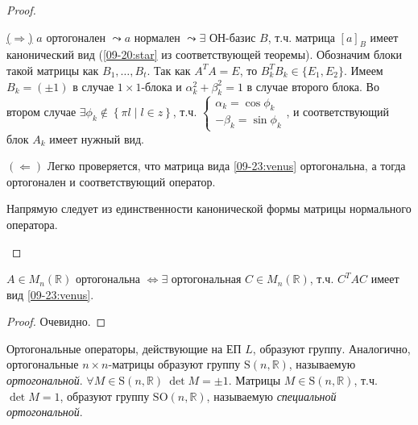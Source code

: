\begin{proof}
    \begin{proofpart}
        \underline{($\Rightarrow$)} $a$ ортогонален $\leadsto a$ нормален $\leadsto \exists$ ОН-базис $B$, т.ч. матрица $[a]_B$ имеет канонический вид (\eqref{09-20:star} из соответствующей теоремы). Обозначим блоки такой матрицы как $B_1, \dots, B_t$. Так как $A^T A = E$, то $B_k^T B_k \in \{E_1, E_2\}$. Имеем $B_k = (\pm 1)$ в случае $1 \times 1$-блока и $\alpha_k^2 + \beta_k^2 = 1$ в случае второго блока. Во втором случае $\exists \phi_k \not\in \left\{\pi l \mid l \in z \right\}$, т.ч. $\begin{cases}
            \alpha_k = \cos \phi_k \\
            -\beta_k = \sin \phi_k
        \end{cases}$, и соответствующий блок $A_k$ имеет нужный вид.
        \smallskip
        
        \underline{$(\Leftarrow)$} Легко проверяется, что матрица вида \eqref{09-23:venus} ортогональна, а тогда ортогонален и соответствующий оператор.
    \end{proofpart}

    \begin{proofpart}
        Напрямую следует из единственности канонической формы матрицы нормального оператора.
    \end{proofpart}
\end{proof}

\begin{cor*}
    $A \in M_n(\mathbb{R})$ ортогональна $\Leftrightarrow \exists$ ортогональная $C \in M_n(\mathbb{R})$, т.ч. $C^T AC$ имеет вид \eqref{09-23:venus}.
\end{cor*}

\begin{proof}
    Очевидно.
\end{proof}

\begin{defn}
    Ортогональные операторы, действующие на ЕП $L$, образуют группу. Аналогично, ортогональные $n \times n$-матрицы образуют группу $\text{S}(n, \mathbb{R})$, называемую \textit{ортогональной}. $\forall M \in \text{S}(n, \mathbb{R})\ \det M = \pm 1$. Матрицы $M \in \text{S}(n, \mathbb{R})$, т.ч. $\det M = 1$, образуют группу $\text{SO}(n, \mathbb{R})$, называемую \textit{специальной ортогональной}.
\end{defn}